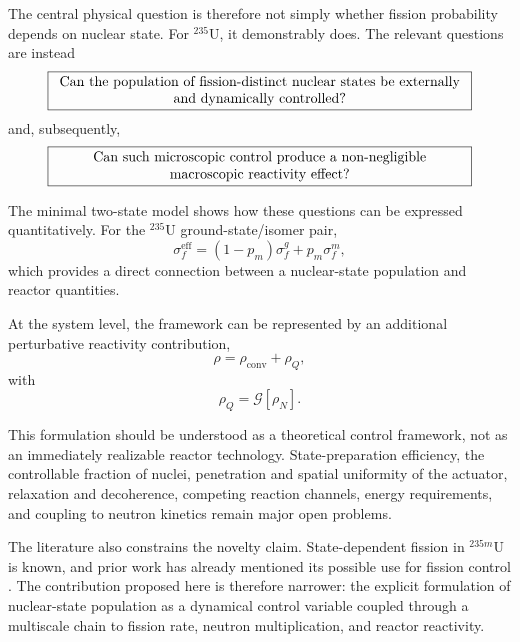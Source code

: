 The central physical question is therefore not simply whether fission probability depends on nuclear state. For $^{235}$U, it demonstrably does. The relevant questions are instead
\begin{equation}
\boxed{
\begin{minipage}{0.86\columnwidth}
\centering
Can the population of fission-distinct nuclear states be externally\\
and dynamically controlled?
\end{minipage}
}
\end{equation}
and, subsequently,
\begin{equation}
\boxed{
\begin{minipage}{0.86\columnwidth}
\centering
Can such microscopic control produce a non-negligible\\
macroscopic reactivity effect?
\end{minipage}
}
\end{equation}

The minimal two-state model shows how these questions can be expressed quantitatively. For the $^{235}$U ground-state/isomer pair,
\begin{equation}
\sigma_f^{\mathrm{eff}}
=
(1-p_m)\sigma_f^g
+
p_m\sigma_f^m,
\end{equation}
which provides a direct connection between a nuclear-state population and reactor quantities.

At the system level, the framework can be represented by an additional perturbative reactivity contribution,
\begin{equation}
\rho
=
\rho_{\mathrm{conv}}
+
\rho_Q,
\end{equation}
with
\begin{equation}
\rho_Q
=
\mathcal{G}[\rho_N].
\end{equation}

This formulation should be understood as a theoretical control framework, not as an immediately realizable reactor technology. State-preparation efficiency, the controllable fraction of nuclei, penetration and spatial uniformity of the actuator, relaxation and decoherence, competing reaction channels, energy requirements, and coupling to neutron kinetics remain major open problems.

The literature also constrains the novelty claim. State-dependent fission in $^{235m}$U is known, and prior work has already mentioned its possible use for fission control \cite{LiuWang2022}. The contribution proposed here is therefore narrower: the explicit formulation of nuclear-state population as a dynamical control variable coupled through a multiscale chain to fission rate, neutron multiplication, and reactor reactivity.

